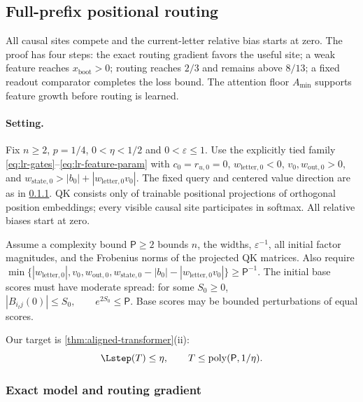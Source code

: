 \providecommand{\LRnorm}[1]{\left\lVert #1\right\rVert}
\subsection{Full-prefix positional routing}
\label{app:weak-seeded-full-prefix-routing}

All causal sites compete and the current-letter relative bias starts at zero.
The proof has four steps: the exact routing gradient favors the useful site;
a weak feature reaches $x_{\mathrm{boot}}>0$; routing reaches $2/3$ and remains
above $8/13$; a fixed readout comparator completes the loss bound.
The attention floor $A_{\min}$ supports feature growth before routing is learned.

\paragraph{Setting.}\label{app:lr-setting}
Fix $n\ge2$, $p=1/4$, $0<\eta<1/2$ and $0<\varepsilon\le1$.
Use the explicitly tied family \eqref{eq:lr-gates}--\eqref{eq:lr-feature-param}
with $c_0=r_{u,0}=0$, $w_{\mathrm{letter},0}<0$, $v_0,w_{\mathrm{out},0}>0$, and
$w_{\mathrm{state},0}>|b_0|+|w_{\mathrm{letter},0}v_0|$. The fixed query and centered value direction
are as in \cref{app:weak-routing-family}. QK consists only of trainable
positional projections of orthogonal position embeddings; every visible
causal site participates in softmax. All relative biases start at zero.

Assume a complexity bound $\mathsf P\ge2$ bounds $n$, the widths,
$\varepsilon^{-1}$, all initial factor magnitudes, and the Frobenius norms
of the projected QK matrices. Also require
 $\min\{|w_{\mathrm{letter},0}|,v_0,w_{\mathrm{out},0},w_{\mathrm{state},0}-|b_0|-|w_{\mathrm{letter},0}v_0|\}\ge \mathsf P^{-1}.$ 
The initial base scores must have moderate spread: for some $S_0\ge0$,
 $|B_{i_tj}(0)|\le S_0,\qquad e^{2S_0}\le \mathsf P.$ 
Base scores may be bounded perturbations of equal scores.

Our target is \cref{thm:aligned-transformer}(ii):
\begin{equation}\label{eq:lr-finite-theorem}
 \Lstep(T)\le\eta,\qquad T\le\operatorname{poly}(\mathsf P,1/\eta).
\end{equation}

\subsubsection{Exact model and routing gradient}
\label{app:weak-routing-family}

